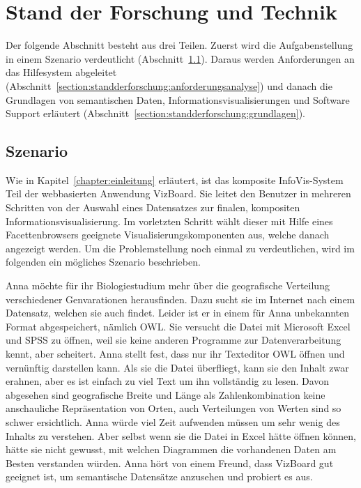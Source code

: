 \documentclass[
	headsepline,
	footsepline,
	fontsize=12pt,
	bibliography=totoc
]{scrbook}
\begin{document}
\chapter{Stand der Forschung und Technik}
\label{chapter:standderforschung}

Der folgende Abschnitt besteht aus drei Teilen. Zuerst wird die Aufgabenstellung in einem Szenario verdeutlicht (Abschnitt~\ref{section:standderforschung:szenario}). Daraus werden Anforderungen an das Hilfesystem abgeleitet (Abschnitt~\ref{section:standderforschung:anforderungsanalyse}) und danach die Grundlagen von semantischen Daten, Informationsvisualisierungen und Software Support erläutert (Abschnitt~\ref{section:standderforschung:grundlagen}).

\section{Szenario}
\label{section:standderforschung:szenario}


Wie in Kapitel~\ref{chapter:einleitung} erläutert, ist das komposite InfoVis-System Teil der webbasierten Anwendung VizBoard. Sie leitet den Benutzer in mehreren Schritten von der Auswahl eines Datensatzes zur finalen, kompositen Informationsvisualisierung. Im vorletzten Schritt wählt dieser mit Hilfe eines Facettenbrowsers geeignete Visualisierungskomponenten aus, welche danach angezeigt werden. Um die Problemstellung noch einmal zu verdeutlichen, wird im folgenden ein mögliches Szenario beschrieben.

Anna möchte für ihr Biologiestudium mehr über die geografische Verteilung verschiedener Genvarationen herausfinden. Dazu sucht sie im Internet nach einem Datensatz, welchen sie auch findet. 
Leider ist er in einem für Anna unbekannten Format abgespeichert, nämlich OWL. Sie versucht die Datei mit Microsoft Excel und SPSS zu öffnen, weil sie keine anderen Programme zur Datenverarbeitung kennt, aber scheitert. Anna stellt fest, dass nur ihr Texteditor OWL öffnen und vernünftig darstellen kann. Als sie die Datei überfliegt, kann sie den Inhalt zwar erahnen, aber es ist einfach zu viel Text um ihn vollständig zu lesen. Davon abgesehen sind geografische Breite und Länge als Zahlenkombination keine anschauliche Repräsentation von Orten, auch Verteilungen von Werten sind so schwer ersichtlich. Anna würde viel Zeit aufwenden müssen um sehr wenig des Inhalts zu verstehen. Aber selbst wenn sie die Datei in Excel hätte öffnen können, hätte sie nicht gewusst, mit welchen Diagrammen die vorhandenen Daten am Besten verstanden würden. Anna hört von einem Freund, dass VizBoard gut geeignet ist, um semantische Datensätze anzusehen und probiert es aus.
\end{document}
